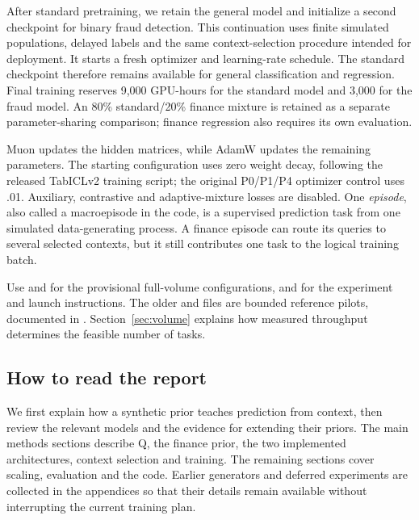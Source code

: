 \documentclass[11pt]{article}
\begin{document}
After standard pretraining, we retain the general model and initialize a second checkpoint for binary fraud detection. This continuation uses finite simulated populations, delayed labels and the same context-selection procedure intended for deployment. It starts a fresh optimizer and learning-rate schedule. The standard checkpoint therefore remains available for general classification and regression. Final training reserves 9,000 GPU-hours for the standard model and 3,000 for the fraud model. An 80\% standard/20\% finance mixture is retained as a separate parameter-sharing comparison; finance regression also requires its own evaluation.

Muon updates the hidden matrices, while AdamW updates the remaining parameters. The starting configuration uses zero weight decay, following the released TabICLv2 training script; the original P0/P1/P4 optimizer control uses .01. Auxiliary, contrastive and adaptive-mixture losses are disabled. One \emph{episode}, also called a macroepisode in the code, is a supervised prediction task from one simulated data-generating process. A finance episode can route its queries to several selected contexts, but it still contributes one task to the logical training batch.

Use  and  for the provisional full-volume configurations, and  for the experiment and launch instructions. The older  and  files are bounded reference pilots, documented in . Section~\ref{sec:volume} explains how measured throughput determines the feasible number of tasks.

\subsection{How to read the report}

We first explain how a synthetic prior teaches prediction from context, then review the relevant models and the evidence for extending their priors. The main methods sections describe Q, the finance prior, the two implemented architectures, context selection and training. The remaining sections cover scaling, evaluation and the code. Earlier generators and deferred experiments are collected in the appendices so that their details remain available without interrupting the current training plan.
\end{document}
